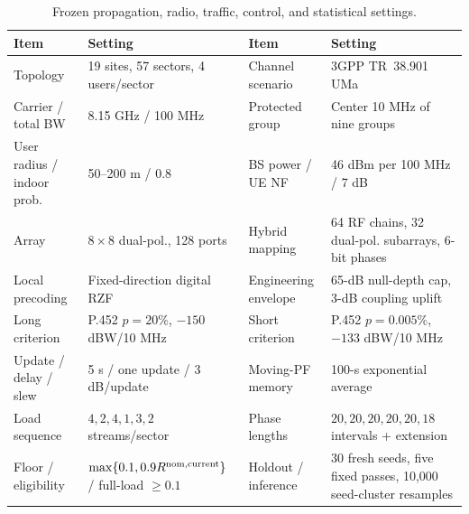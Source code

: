 \begin{table}[t]
\caption{Frozen propagation, radio, traffic, control, and statistical settings.}
\label{tab:parameters-expanded}
\centering
\footnotesize
\setlength{\tabcolsep}{4.3pt}
\renewcommand{\arraystretch}{1.05}
\begin{tabular}{@{}p{}p{}p{}p{}@{}}
\toprule
Item & Setting & Item & Setting\\
\midrule
Topology & 19 sites, 57 sectors, 4 users/sector & Channel scenario & 3GPP TR~38.901 UMa\\
Carrier / total BW & 8.15 GHz / 100 MHz & Protected group & Center 10 MHz of nine groups\\
User radius / indoor prob. & 50--200 m / 0.8 & BS power / UE NF & 46 dBm per 100 MHz / 7 dB\\
Array & $8\times8$ dual-pol., 128 ports & Hybrid mapping & 64 RF chains, 32 dual-pol. subarrays, 6-bit phases\\
Local precoding & Fixed-direction digital RZF & Engineering envelope & 65-dB null-depth cap, 3-dB coupling uplift\\
Long criterion & P.452 $p=20\%$, $-150$ dBW/10 MHz & Short criterion & P.452 $p=0.005\%$, $-133$ dBW/10 MHz\\
Update / delay / slew & 5 s / one update / 3 dB/update & Moving-PF memory & 100-s exponential average\\
Load sequence & $4,2,4,1,3,2$ streams/sector & Phase lengths & $20,20,20,20,20,18$ intervals + extension\\
Floor / eligibility & $\max\{0.1,0.9R^{\rm nom,current}\}$ / full-load $\ge0.1$ & Holdout / inference & 30 fresh seeds, five fixed passes, 10,000 seed-cluster resamples\\
\bottomrule
\end{tabular}
\end{table}
